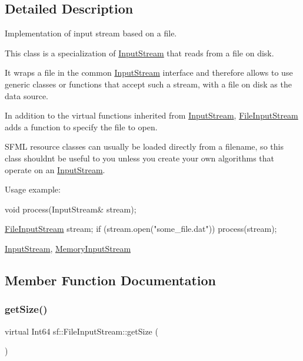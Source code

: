 \subsection{Detailed Description}
Implementation of input stream based on a file. 

This class is a specialization of \hyperlink{classsf_1_1_input_stream}{Input\+Stream} that reads from a file on disk.

It wraps a file in the common \hyperlink{classsf_1_1_input_stream}{Input\+Stream} interface and therefore allows to use generic classes or functions that accept such a stream, with a file on disk as the data source.

In addition to the virtual functions inherited from \hyperlink{classsf_1_1_input_stream}{Input\+Stream}, \hyperlink{classsf_1_1_file_input_stream}{File\+Input\+Stream} adds a function to specify the file to open.

S\+F\+ML resource classes can usually be loaded directly from a filename, so this class shouldn\textquotesingle{}t be useful to you unless you create your own algorithms that operate on an \hyperlink{classsf_1_1_input_stream}{Input\+Stream}.

Usage example\+: 
\begin{DoxyCode}
\textcolor{keywordtype}{void} process(InputStream& stream);

\hyperlink{classsf_1_1_file_input_stream_a9a321e273f41ff7f187899061fcae9be}{FileInputStream} stream;
\textcolor{keywordflow}{if} (stream.open(\textcolor{stringliteral}{"some\_file.dat"}))
   process(stream);
\end{DoxyCode}


\hyperlink{classsf_1_1_input_stream}{Input\+Stream}, \hyperlink{classsf_1_1_memory_input_stream}{Memory\+Input\+Stream} 

\subsection{Member Function Documentation}
\mbox{\label{classsf_1_1_file_input_stream_aabdcaa315e088e008eeb9711ecc796e8}} 
\subsubsection{\texorpdfstring{get\+Size()}{getSize()}}
{\footnotesize\ttfamily virtual Int64 sf\+::\+File\+Input\+Stream\+::get\+Size (\begin{DoxyParamCaption}{ }\end{DoxyParamCaption})\hspace{0.3cm}{\ttfamily [virtual]}}



